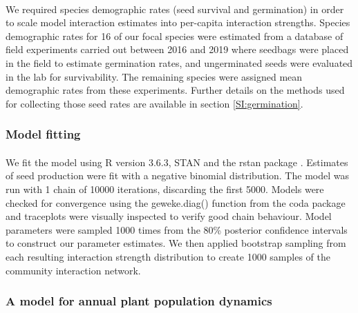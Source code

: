 \documentclass[a4,12pt]{article}
\begin{document}
        \paragraph{} 
        We required species demographic rates (seed survival and germination) in order to scale model interaction estimates into per-capita interaction strengths. Species demographic rates for 16 of our focal species were estimated from a database of field experiments carried out between 2016 and 2019 where seedbags were placed in the field to estimate germination rates, and ungerminated seeds were evaluated in the lab for survivability.  The remaining species were assigned mean demographic rates from these experiments. Further details on the methods used for collecting those seed rates are available in section \ref{SI:germination}.

        \subsubsection{Model fitting}

        \paragraph{}
        We fit the model using R version 3.6.3, STAN and the rstan package \parencite{R2020, Carpenter2017, Rstan2020}. Estimates of seed production were fit with a negative binomial distribution. The model was run with 1 chain of 10000 iterations, discarding the first 5000. Models were checked for convergence using the geweke.diag() function from the coda package \parencite{Plummer2006} and traceplots were visually inspected to verify good chain behaviour. Model parameters were sampled 1000 times from the 80\% posterior confidence intervals to construct our parameter estimates. We then applied bootstrap sampling from each resulting interaction strength distribution to create 1000 samples of the community interaction network.

        \subsubsection{A model for annual plant population dynamics}
        \label{SI:popdyn}
\end{document}
